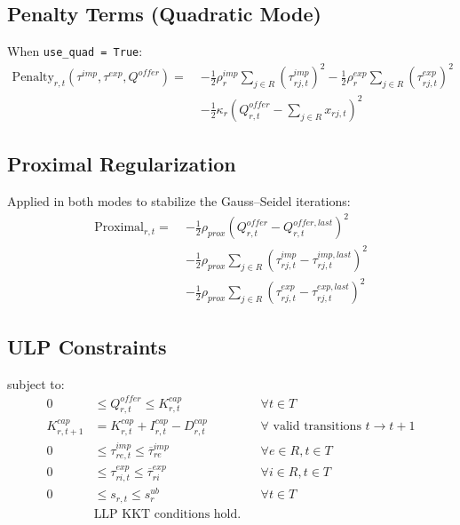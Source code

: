\subsection{Penalty Terms (Quadratic Mode)}

When \texttt{use\_quad = True}:
\begin{align}
\text{Penalty}_{r,t}(\tau^{imp}, \tau^{exp}, Q^{offer}) = \;
& - \tfrac{1}{2} \rho^{imp}_r \sum_{j \in R} \left(\tau^{imp}_{rj,t}\right)^2
  - \tfrac{1}{2} \rho^{exp}_r \sum_{j \in R} \left(\tau^{exp}_{rj,t}\right)^2 \nonumber \\
& - \tfrac{1}{2} \kappa_r \left( Q^{offer}_{r,t} - \sum_{j \in R} x_{rj,t} \right)^2
\end{align}

\subsection{Proximal Regularization}

Applied in both modes to stabilize the Gauss--Seidel iterations:
\begin{align}
\text{Proximal}_{r,t} = \;
& - \tfrac{1}{2} \rho_{prox} \left( Q^{offer}_{r,t} - Q^{offer,last}_{r,t} \right)^2 \nonumber \\
& - \tfrac{1}{2} \rho_{prox} \sum_{j \in R} \left( \tau^{imp}_{rj,t} - \tau^{imp,last}_{rj,t} \right)^2 \nonumber \\
& - \tfrac{1}{2} \rho_{prox} \sum_{j \in R} \left( \tau^{exp}_{rj,t} - \tau^{exp,last}_{rj,t} \right)^2
\end{align}

\subsection{ULP Constraints}

\noindent subject to:
\begin{align}
0 &\le Q^{offer}_{r,t} \le K^{cap}_{r,t} && \forall t \in T \\
K^{cap}_{r,t+1} &= K^{cap}_{r,t} + I^{cap}_{r,t} - D^{cap}_{r,t} && \forall \text{ valid transitions } t \to t+1 \\
0 &\le \tau^{imp}_{re,t} \le \overline{\tau}^{imp}_{re} && \forall e \in R, t \in T \\
0 &\le \tau^{exp}_{ri,t} \le \overline{\tau}^{exp}_{ri} && \forall i \in R, t \in T \\
0 &\le s_{r,t} \le s^{ub}_r && \forall t \in T \\
& \text{LLP KKT conditions hold.} \nonumber
\end{align}

